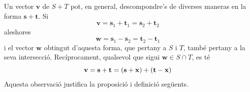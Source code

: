 \begin{observacio}
Un vector $\mathbf{v}$ de $S+T$ pot, en general,
descompondre's de diverses maneras en la forma $\mathbf{s}+\mathbf{t}$. Si%
\begin{equation*}
\mathbf{v}=\mathbf{s}_{1}+\mathbf{t}_{1}=\mathbf{s}_{2}+\mathbf{t}_{2}
\end{equation*}%
aleshores%
\begin{equation*}
\mathbf{w}=\mathbf{s}_{1}-\mathbf{s}_{2}=\mathbf{t}_{2}-\mathbf{t}_{1}
\end{equation*}%
i el vector $\mathbf{w}$ obtingut d’aquesta forma, que pertany a $S$
i $T$, també pertany a la seva intersecció. Recíprocament, qualsevol que sigui $\mathbf{w}\in S\cap T$, es
té%
\begin{equation*}
\mathbf{v}=\mathbf{s}+\mathbf{t}=(\mathbf{s}+\mathbf{x})+(\mathbf{t}-\mathbf{%
x})
\end{equation*}%
Aquesta observació justifica la proposició i definició
següents.
\end{observacio}

